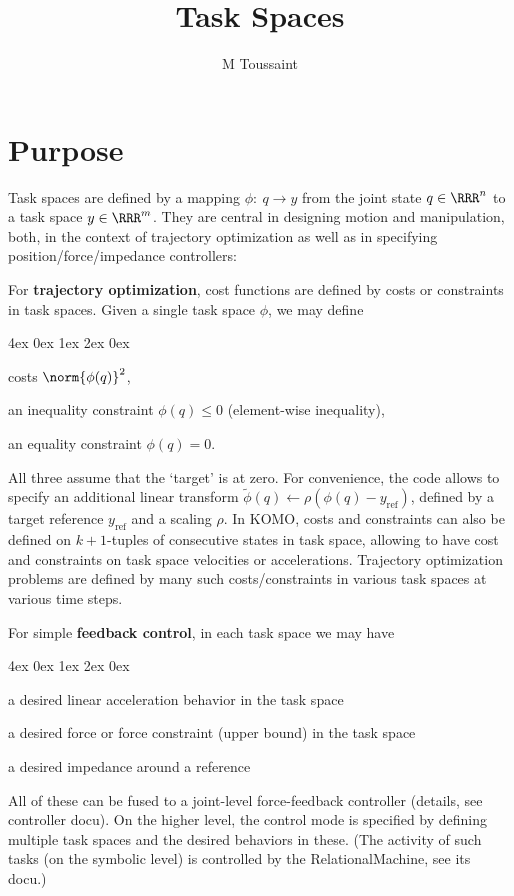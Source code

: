 \documentclass[10pt,fleqn,twoside]{article}
\title{Task Spaces}
\author{M Toussaint}
\newenvironment{items}{
\par\small
\begin{list}{--}{\leftmargin4ex \rightmargin0ex \labelsep1ex \labelwidth2ex
\topsep0pt \parsep0ex \itemsep3pt}
}{
\end{list}
}
\begin{document}
\maketitle

\section{Purpose}

Task spaces are defined by a mapping $\phi:~ q\to y$ from the joint
state $q\in\RRR^n$ to a task space $y\in\RRR^m$. They are central in
designing motion and manipulation, both, in the context of trajectory
optimization as well as in specifying position/force/impedance
controllers:

For \textbf{trajectory optimization}, cost functions are defined by
costs or constraints in task spaces. Given a single task space $\phi$,
we may define
\begin{items}
\item costs $\norm{\phi(q)}^2$,
\item an inequality constraint $\phi(q)\le 0$ (element-wise inequality),
\item an equality constraint $\phi(q) = 0$.
\end{items}
All three assume that the `target' is at zero. For convenience, the
code allows to specify an additional linear transform $\tilde\phi(q)
\gets \rho(\phi(q)-y_\text{ref})$, defined by a target reference
$y_\text{ref}$ and a scaling $\rho$. In KOMO, costs and constraints
can also be defined on $k+1$-tuples of consecutive states in task
space, allowing to have cost and constraints on task space velocities
or accelerations. Trajectory optimization problems are defined by many
such costs/constraints in various task spaces at various time steps.

For simple \textbf{feedback control}, in each task space we may have
\begin{items}
\item a desired linear acceleration behavior in the task space
\item a desired force or force constraint (upper bound) in the task
  space
\item a desired impedance around a reference
\end{items}
All of these can be fused to a joint-level force-feedback controller
(details, see controller docu). On the higher level, the control mode
is specified by defining multiple task spaces and the desired
behaviors in these. (The activity of such tasks (on the symbolic
level) is controlled by the RelationalMachine, see its docu.)
\end{document}
